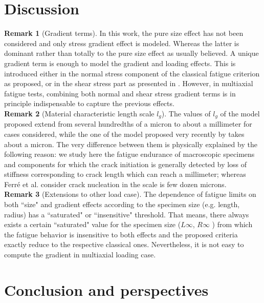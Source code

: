 \section{Discussion}
\noindent\textbf{Remark 1} (Gradient terms). In this work, the pure size effect has not been considered and only stress gradient effect is modeled. Whereas the latter is dominant rather than totally to the pure size effect as usually believed. 
A unique gradient term is enough to model the gradient and loading effects. This is introduced either in the normal stress component of the classical fatigue criterion as \cite{Papadopoulos1996513} proposed, or in the shear stress part as presented in \cite{Massonnet1956}. However, in multiaxial fatigue tests, combining both normal and shear stress gradient terms is in principle indispensable to capture the previous effects.
\vspace{6pt} \\
\textbf{Remark 2} (Material characteristic length scale $l_g$). The values of $l_g$ of the model proposed extend from
several hundredths of a micron to about a millimeter for cases considered, while the one of the model
proposed very recently by  \cite{Ferre201356} takes about a micron. The very difference between them
is physically explained by the following reason: we study here the fatigue endurance of macroscopic
specimens and components for which the crack initiation is generally detected by loss of stiffness corresponding to crack length which can reach a millimeter; whereas Ferr{\'e} et al. consider crack nucleation in
the scale is few dozen microns.
\vspace{6pt} \\
\textbf{Remark 3} (Extensions to other load case). The dependence of fatigue limits on both ``size" and gradient effects according to the specimen size (e.g. length, radius) has a ``saturated" or ``insensitive" threshold. That
means, there always exists a certain ``saturated" value for the specimen size ($L\infty$, $R\infty$ ) from which the
fatigue behavior is insensitive to both effects and the proposed criteria exactly reduce to the respective
classical ones. Nevertheless, it is not easy to compute the gradient in multiaxial loading case.

\section{Conclusion and perspectives}

